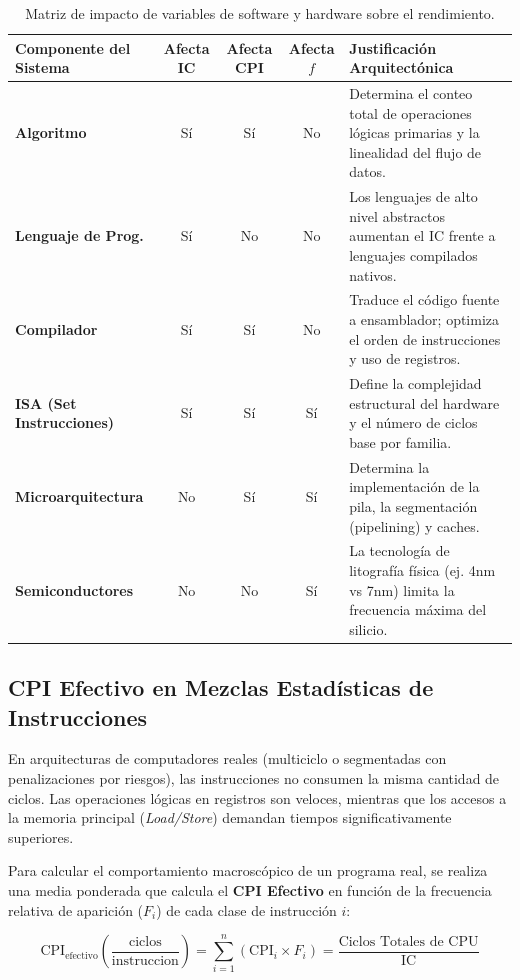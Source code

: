 \documentclass[12pt,letterpaper]{article}
\begin{document}
\begin{table}[h!]
\centering
\small
\renewcommand{\arraystretch}{1.4}
\begin{tabular}{p{3.8cm} c c c p{6cm}}
\toprule
\textbf{Componente del Sistema} & \textbf{Afecta IC} & \textbf{Afecta CPI} & \textbf{Afecta $f$} & \textbf{Justificación Arquitectónica} \\
\midrule
\textbf{Algoritmo} & Sí & Sí & No & Determina el conteo total de operaciones lógicas primarias y la linealidad del flujo de datos. \\
\textbf{Lenguaje de Prog.} & Sí & No & No & Los lenguajes de alto nivel abstractos aumentan el IC frente a lenguajes compilados nativos. \\
\textbf{Compilador} & Sí & Sí & No & Traduce el código fuente a ensamblador; optimiza el orden de instrucciones y uso de registros. \\
\textbf{ISA (Set Instrucciones)} & Sí & Sí & Sí & Define la complejidad estructural del hardware y el número de ciclos base por familia. \\
\textbf{Microarquitectura} & No & Sí & Sí & Determina la implementación de la pila, la segmentación (pipelining) y caches. \\
\textbf{Semiconductores} & No & No & Sí & La tecnología de litografía física (ej. 4nm vs 7nm) limita la frecuencia máxima del silicio. \\
\bottomrule
\end{tabular}
\caption{Matriz de impacto de variables de software y hardware sobre el rendimiento.}
\end{table}

\subsection{CPI Efectivo en Mezclas Estadísticas de Instrucciones}
En arquitecturas de computadores reales (multiciclo o segmentadas con penalizaciones por riesgos), las instrucciones no consumen la misma cantidad de ciclos. Las operaciones lógicas en registros son veloces, mientras que los accesos a la memoria principal (\textit{Load/Store}) demandan tiempos significativamente superiores. 

Para calcular el comportamiento macroscópico de un programa real, se realiza una media ponderada que calcula el \textbf{CPI Efectivo} en función de la frecuencia relativa de aparición ($F_i$) de cada clase de instrucción $i$:

\begin{equation}
\text{CPI}_{\text{efectivo}} \left(\frac{\text{ciclos}}{\text{instruccion}}\right) = \sum_{i=1}^{n} (\text{CPI}_i \times F_i) = \frac{\text{Ciclos Totales de CPU}}{\text{IC}}
\end{equation}
\end{document}
